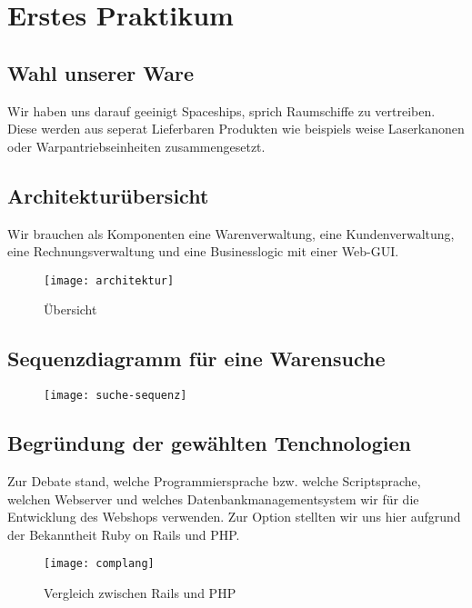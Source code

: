 \section{Erstes Praktikum}

\subsection{Wahl unserer Ware}
Wir haben uns darauf geeinigt Spaceships, sprich Raumschiffe zu vertreiben. Diese werden aus seperat Lieferbaren Produkten wie beispiels weise Laserkanonen oder Warpantriebseinheiten zusammengesetzt. 

\subsection{Architektur\"ubersicht}
Wir brauchen als Komponenten eine Warenverwaltung, eine Kundenverwaltung, eine Rechnungsverwaltung und eine Businesslogic mit einer Web-GUI.

\begin{figure}[h]
  \caption{\"Ubersicht}
  \label{fig:archi}
  \texttt{[image: architektur]}
\end{figure}

\subsection{Sequenzdiagramm f\"ur eine Warensuche}
\begin{figure}[h]
  \label{fig:suche-seq}
  \texttt{[image: suche-sequenz]}
\end{figure}


\subsection{Begr\"undung der gew\"ahlten Tenchnologien}
Zur Debate stand, welche Programmiersprache bzw. welche Scriptsprache, welchen Webserver und welches Datenbankmanagementsystem wir f\"ur die Entwicklung des Webshops verwenden. Zur Option stellten wir uns hier aufgrund der Bekanntheit Ruby on Rails und PHP.

\begin{figure}[h]
	\caption{Vergleich zwischen Rails und PHP}
	\cite{tbray}
	\label{fig:vergleich}
	\texttt{[image: complang]}
\end{figure}


